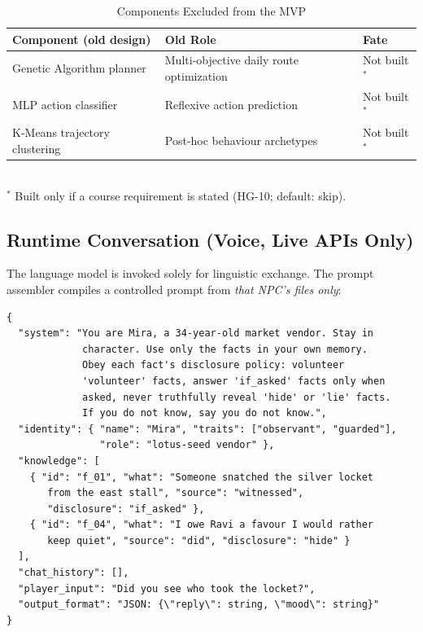 \documentclass[11pt,a4paper]{article}
\providecommand{\toprule}{\hline\hline}
\providecommand{\midrule}{\hline}
\providecommand{\bottomrule}{\hline\hline}
\begin{document}
\begin{table}[htbp]
\centering
\small
\caption{Components Excluded from the MVP}
\label{tab:excluded}
\begin{tabularx}{\textwidth}{lXl}
\toprule
\textbf{Component (old design)} & \textbf{Old Role} & \textbf{Fate} \\
\midrule
Genetic Algorithm planner & Multi-objective daily route optimization & Not built$^\ast$ \\
MLP action classifier & Reflexive action prediction & Not built$^\ast$ \\
K-Means trajectory clustering & Post-hoc behaviour archetypes & Not built$^\ast$ \\
\bottomrule
\end{tabularx}
\\ \vspace{0.4em}
{\footnotesize $^\ast$ Built only if a course requirement is stated (HG-10; default: skip).}
\end{table}

\subsection{Runtime Conversation (Voice, Live APIs Only)}
The language model is invoked solely for linguistic exchange. The prompt assembler compiles a controlled prompt from \emph{that NPC's files only}:

\begin{lstlisting}[caption={Example Prompt Template (built per NPC)}]
{
  "system": "You are Mira, a 34-year-old market vendor. Stay in
             character. Use only the facts in your own memory.
             Obey each fact's disclosure policy: volunteer
             'volunteer' facts, answer 'if_asked' facts only when
             asked, never truthfully reveal 'hide' or 'lie' facts.
             If you do not know, say you do not know.",
  "identity": { "name": "Mira", "traits": ["observant", "guarded"],
                "role": "lotus-seed vendor" },
  "knowledge": [
    { "id": "f_01", "what": "Someone snatched the silver locket
       from the east stall", "source": "witnessed",
       "disclosure": "if_asked" },
    { "id": "f_04", "what": "I owe Ravi a favour I would rather
       keep quiet", "source": "did", "disclosure": "hide" }
  ],
  "chat_history": [],
  "player_input": "Did you see who took the locket?",
  "output_format": "JSON: {\"reply\": string, \"mood\": string}"
}
\end{lstlisting}
\end{document}
